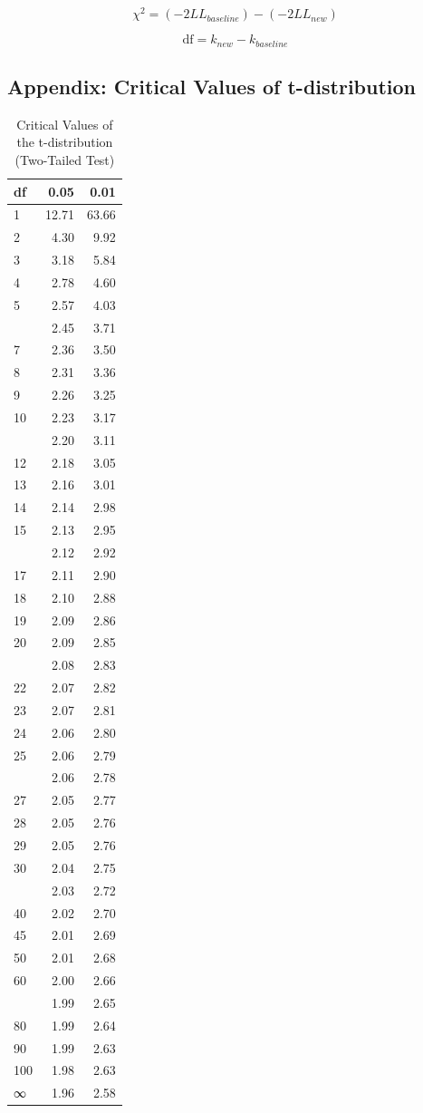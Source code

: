 \documentclass[
]{article}
\begin{document}
\[\chi^2 = (-2LL_{baseline}) - (-2LL_{new})\]

\[\textrm{df} = k_{new} - k_{baseline}\]

\subsection{Appendix: Critical Values of
t-distribution}\label{appendix-critical-values-of-t-distribution}

\begin{longtable}[t]{lrr}
\caption{\label{tab:unnamed-chunk-1}Critical Values of the t-distribution (Two-Tailed Test)}\\
\toprule
df & 0.05 & 0.01\\
\midrule
1 & 12.71 & 63.66\\
2 & 4.30 & 9.92\\
3 & 3.18 & 5.84\\
4 & 2.78 & 4.60\\
5 & 2.57 & 4.03\\
\addlinespace
6 & 2.45 & 3.71\\
7 & 2.36 & 3.50\\
8 & 2.31 & 3.36\\
9 & 2.26 & 3.25\\
10 & 2.23 & 3.17\\
\addlinespace
11 & 2.20 & 3.11\\
12 & 2.18 & 3.05\\
13 & 2.16 & 3.01\\
14 & 2.14 & 2.98\\
15 & 2.13 & 2.95\\
\addlinespace
16 & 2.12 & 2.92\\
17 & 2.11 & 2.90\\
18 & 2.10 & 2.88\\
19 & 2.09 & 2.86\\
20 & 2.09 & 2.85\\
\addlinespace
21 & 2.08 & 2.83\\
22 & 2.07 & 2.82\\
23 & 2.07 & 2.81\\
24 & 2.06 & 2.80\\
25 & 2.06 & 2.79\\
\addlinespace
26 & 2.06 & 2.78\\
27 & 2.05 & 2.77\\
28 & 2.05 & 2.76\\
29 & 2.05 & 2.76\\
30 & 2.04 & 2.75\\
\addlinespace
35 & 2.03 & 2.72\\
40 & 2.02 & 2.70\\
45 & 2.01 & 2.69\\
50 & 2.01 & 2.68\\
60 & 2.00 & 2.66\\
\addlinespace
70 & 1.99 & 2.65\\
80 & 1.99 & 2.64\\
90 & 1.99 & 2.63\\
100 & 1.98 & 2.63\\
∞ & 1.96 & 2.58\\
\bottomrule
\end{longtable}
\end{document}
